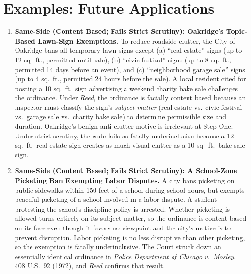 \documentclass[12pt]{article}
\begin{document}
\section{Examples: Future Applications}
\begin{enumerate}

\item \textbf{Same-Side (Content Based; Fails Strict Scrutiny): Oakridge's Topic-Based Lawn-Sign Exemptions.} To reduce roadside clutter, the City of Oakridge bans all temporary lawn signs except (a) ``real estate'' signs (up to 12 sq.\ ft., permitted until sale), (b) ``civic festival'' signs (up to 8 sq.\ ft., permitted 14 days before an event), and (c) ``neighborhood garage sale'' signs (up to 4 sq.\ ft., permitted 24 hours before the sale). A local resident cited for posting a 10 sq.\ ft.\ sign advertising a weekend charity bake sale challenges the ordinance. Under \textit{Reed}, the ordinance is facially content based because an inspector must classify the sign's \textit{subject matter} (real estate vs.\ civic festival vs.\ garage sale vs.\ charity bake sale) to determine permissible size and duration. Oakridge's benign anti-clutter motive is irrelevant at Step One. Under strict scrutiny, the code fails as fatally underinclusive because a 12 sq.\ ft.\ real estate sign creates as much visual clutter as a 10 sq.\ ft.\ bake-sale sign.

\item \textbf{Same-Side (Content Based; Fails Strict Scrutiny): A School-Zone Picketing Ban Exempting Labor Disputes.} A city bans picketing on public sidewalks within 150 feet of a school during school hours, but exempts peaceful picketing of a school involved in a labor dispute. A student protesting the school's discipline policy is arrested. Whether picketing is allowed turns entirely on its subject matter, so the ordinance is content based on its face even though it favors no viewpoint and the city's motive is to prevent disruption. Labor picketing is no less disruptive than other picketing, so the exemption is fatally underinclusive. The Court struck down an essentially identical ordinance in \textit{Police Department of Chicago v.\ Mosley}, 408 U.S.\ 92 (1972), and \textit{Reed} confirms that result.


\end{enumerate}
\end{document}
